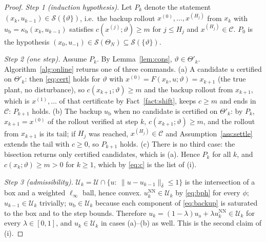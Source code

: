 \begin{proof}
\emph{Step 1 (induction hypothesis).} Let $P_k$ denote the statement $(x_k,u_{k-1})\in\mathcal S(\{\vartheta\})$, i.e.\ the backup rollout $x^{(0)},\dots,x^{(H_j)}$ from $x_k$ with $u_{\mathrm b}=\kappa_{\mathrm b}(x_k,u_{k-1})$ satisfies $c(x^{(j)};\vartheta)\ge m$ for $j\le H_j$ and $x^{(H_j)}\in\mathcal C$. $P_0$ is the hypothesis $(x_0,u_{-1})\in\mathcal S(\Theta_N)\subseteq\mathcal S(\{\vartheta\})$.

\emph{Step 2 (one step).} Assume $P_k$. By Lemma~\ref{lem:cons}, $\vartheta\in\Theta'_k$. Algorithm~\ref{alg:online} returns one of three commands. (a) A candidate $u$ certified on $\Theta'_k$: then \eqref{eq:cert} holds for $\vartheta$ with $x^{(0)}=F(x_k,u;\vartheta)=x_{k+1}$ (the true plant, no disturbance), so $c(x_{k+1};\vartheta)\ge m$ and the backup rollout from $x_{k+1}$, which is $x^{(1)},\dots$ of that certificate by Fact~\ref{fact:shift}, keeps $c\ge m$ and ends in $\mathcal C$: $P_{k+1}$ holds. (b) The backup $u_{\mathrm b}$ when no candidate is certified on $\Theta'_k$: by $P_k$, $x_{k+1}=x^{(0)}$ of the rollout verified at step $k$, $c(x_{k+1};\vartheta)\ge m$, and the rollout from $x_{k+1}$ is its tail; if $H_j$ was reached, $x^{(H_j)}\in\mathcal C$ and Assumption~\ref{ass:settle} extends the tail with $c\ge0$, so $P_{k+1}$ holds. (c) There is no third case: the bisection returns only certified candidates, which is (a). Hence $P_k$ for all $k$, and $c(x_k;\vartheta)\ge m>0$ for $k\ge1$, which by \eqref{eq:c} is the list of (i).

\emph{Step 3 (admissibility).} $\mathcal U_k=\mathcal U\cap\{u:\ \|u-u_{k-1}\|_{\bar\delta}\le1\}$ is the intersection of a box and a weighted $\ell_\infty$ ball, hence convex. $u^{\mathrm{NN}}_k\in\mathcal U_k$ by \eqref{eq:bph} for every $\phi$; $u_{k-1}\in\mathcal U_k$ trivially; $u_{\mathrm b}\in\mathcal U_k$ because each component of \eqref{eq:backup} is saturated to the box and to the step bounds. Therefore $u_k=(1-\lambda)u_{\mathrm a}+\lambda u^{\mathrm{NN}}_k\in\mathcal U_k$ for every $\lambda\in[0,1]$, and $u_k\in\mathcal U_k$ in cases (a)--(b) as well. This is the second claim of (i).


\end{proof}
